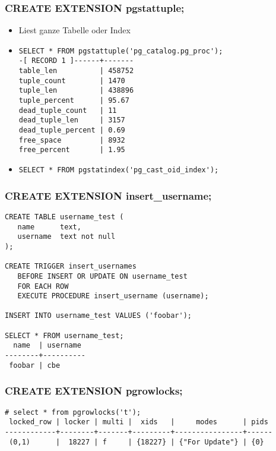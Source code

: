 \documentclass[utf8,hyperref={pdftex,colorlinks,linkcolor=black,citecolor=black,urlcolor=black,filecolor=black,plainpages=false},xcolor=table,hyperref]{beamer}
\begin{document}
\begin{frame}[containsverbatim]
	\frametitle{CREATE EXTENSION pgstattuple;}
	\begin{itemize}
		\item Liest ganze Tabelle oder Index
		\item \begin{verbatim}
SELECT * FROM pgstattuple('pg_catalog.pg_proc');
-[ RECORD 1 ]------+-------
table_len          | 458752
tuple_count        | 1470
tuple_len          | 438896
tuple_percent      | 95.67
dead_tuple_count   | 11
dead_tuple_len     | 3157
dead_tuple_percent | 0.69
free_space         | 8932
free_percent       | 1.95
\end{verbatim}
\item \begin{verbatim}
SELECT * FROM pgstatindex('pg_cast_oid_index');
\end{verbatim}
\end{itemize}
\end{frame}

\begin{frame}[containsverbatim]
	\frametitle{CREATE EXTENSION insert_username;}
	\begin{verbatim}
CREATE TABLE username_test (
   name	     text,
   username  text not null
);

CREATE TRIGGER insert_usernames
   BEFORE INSERT OR UPDATE ON username_test
   FOR EACH ROW
   EXECUTE PROCEDURE insert_username (username);

INSERT INTO username_test VALUES ('foobar');

SELECT * FROM username_test;
  name  | username 
--------+----------
 foobar | cbe
\end{verbatim}

\end{frame}

\begin{frame}[containsverbatim]
	\frametitle{CREATE EXTENSION pgrowlocks;}
	\small
	\begin{verbatim}
# select * from pgrowlocks('t');
 locked_row | locker | multi |  xids   |     modes      | pids 
------------+--------+-------+---------+----------------+------
 (0,1)      |  18227 | f     | {18227} | {"For Update"} | {0}
 \end{verbatim}
\end{frame}
\end{document}
